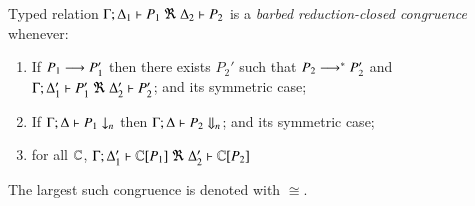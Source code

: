 \begin{definition}\rm
\label{def:rc}
	Typed relation
	$\horel{\Gamma}{\Delta_1}{P_1}{\ \Re\ }{\Delta_2}{P_2}$
	is a {\em barbed reduction-closed congruence} whenever:
	\begin{enumerate}
	\item	If $P_1 \longrightarrow P_1'$ then there exists $P_2'$ such that $P_2 \longrightarrow^* P_2'$ and
	$\horel{\Gamma}{\Delta_1'}{P_1'}{\ \Re\ }{\Delta_2'}{P_2'}$; 
and its symmetric case;

			\item	If $\Gamma;\Delta \vdash P_1 \downarrow_{n}$ then $\Gamma;\Delta \vdash P_2 \Downarrow_{n}$; and its symmetric case; 


		\item	for all ${\Bbb C}$, $\horel{\Gamma}{\Delta_1'}{\context{\C}{P_1}}{\ \Re\ }{\Delta_2'}{\context{\C}{P_2}}$
	\end{enumerate}
	The largest such congruence is denoted with $\cong$.
\end{definition}


